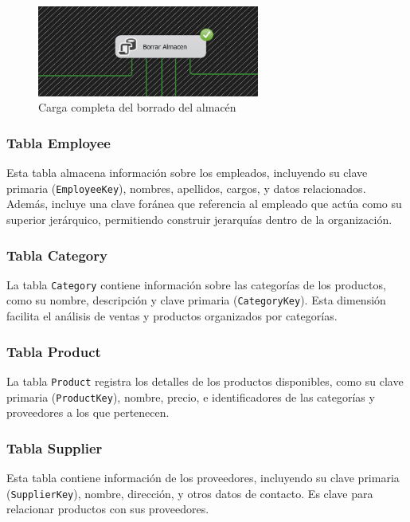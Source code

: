 \documentclass{article}
\begin{document}
	\begin{figure}[H]
		\begin{center} 
			\includegraphics[width=0.65\textwidth]{images/completados/borrado_almacen.png}
			\caption{Carga completa del borrado del almacén}
			\label{fig:borrado_completo}
		\end{center}
	\end{figure}
	
	
	
	\subsubsection{Tabla Employee}
	Esta tabla almacena información sobre los empleados, incluyendo su clave primaria (\texttt{EmployeeKey}), nombres, apellidos, cargos, y datos relacionados. Además, incluye una clave foránea que referencia al empleado que actúa como su superior jerárquico, permitiendo construir jerarquías dentro de la organización.
	
	\subsubsection{Tabla Category}
	La tabla \texttt{Category} contiene información sobre las categorías de los productos, como su nombre, descripción y clave primaria (\texttt{CategoryKey}). Esta dimensión facilita el análisis de ventas y productos organizados por categorías.
	
	\subsubsection{Tabla Product}
	La tabla \texttt{Product} registra los detalles de los productos disponibles, como su clave primaria (\texttt{ProductKey}), nombre, precio, e identificadores de las categorías y proveedores a los que pertenecen.
	
	\subsubsection{Tabla Supplier}
	Esta tabla contiene información de los proveedores, incluyendo su clave primaria (\texttt{SupplierKey}), nombre, dirección, y otros datos de contacto. Es clave para relacionar productos con sus proveedores.
	
\end{document}
